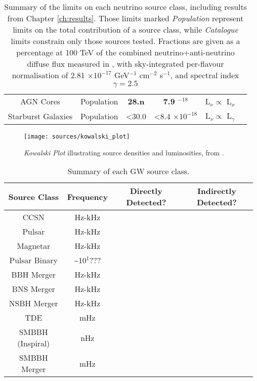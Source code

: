 \begin{table*}[]
\begin{tabular}{|c c c c c c|}
		AGN Cores & Population & \textbf{28.n} &\textbf{7.9 \times 10$^{-18}$}& L$_{\nu} \propto$ L$_{x}$&\cite{federica_thesis}\\
		Starburst Galaxies & Population &<30.0& <8.4 $\times 10^{-18}$ & L$_{\nu} \propto$ L$_{\gamma}$&\cite{bechtol_sbg_17}\\
		\hline
	\end{tabular}
	\caption{Summary of the limits on each neutrino source class, including results from Chapter \ref{ch:results}. Those limits marked \emph{Population} represent limits on the total contribution of a source class, while \emph{Catalogue} limits constrain only those sources tested. Fractions are given as a percentage  at 100 TeV of the combined neutrino+anti-neutrino diffuse flux measured in \cite{ic_global_fit_15}, with sky-integrated per-flavour normalisation of 2.81 $\times 10^{-17}$ GeV$^{-1}$ cm$^{-2}$ s$^{-1}$, and spectral index $\gamma=2.5$}
	\label{tab:source_limits}
\end{table*}{}

\begin{figure}[!ht]
	\centering \texttt{[image: sources/kowalski\_plot]}
	\caption{\emph{Kowalski Plot} illustrating source densities and luminosities, from \cite{ic_gen2_20}.}
	\label{fig:kowalski_plot}
\end{figure}

\begin{table*}[]
	\centering
	\begin{tabular}{| c c c c |} 
		\hline
		Source Class & Frequency & Directly Detected? & Indirectly Detected? \\ 
		\hline
		CCSN &Hz-kHz&\xmark&\xmark\\
		Pulsar &Hz-kHz &\xmark&\xmark\\
		Magnetar & Hz-kHz &\xmark&\xmark\\
		Pulsar Binary &\sim10$^{1}$???&\xmark&\textcolor{ForestGreen}{\cmark}\\
		BBH Merger &Hz-kHz&\textcolor{ForestGreen}{\cmark}&\xmark\\
		BNS Merger &Hz-kHz&\textcolor{ForestGreen}{\cmark}&\xmark\\
		NSBH Merger &Hz-kHz&\textcolor{ForestGreen}{\cmark}&\xmark\\
		TDE&mHz&\xmark&\xmark\\
		SMBBH (Inspiral) & nHz &\xmark&\xmark\\
		SMBBH Merger & mHz &\xmark&\xmark\\
		\hline
	\end{tabular}
	\caption{Summary of each GW source class.}
	\label{tab:gw_source_table}
\end{table*}{}